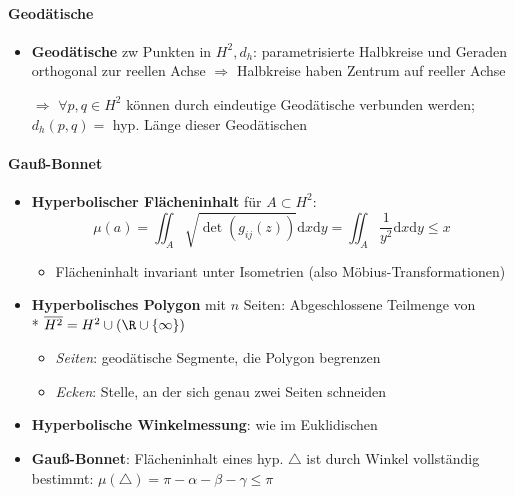 \paragraph{Geodätische}
\begin{itemize}
  \item \textbf{Geodätische} zw Punkten in \( H^2, d_h \): parametrisierte Halbkreise und Geraden orthogonal zur reellen Achse \( \Rightarrow \) Halbkreise haben Zentrum auf reeller Achse
  \item[\( \Rightarrow \)] \( \forall p,q \in H^2 \) können durch eindeutige Geodätische verbunden werden;\@ \( d_h(p,q) = \) hyp. Länge dieser Geodätischen
\end{itemize}

\paragraph{Gauß-Bonnet}
\begin{itemize}
  \item \textbf{Hyperbolischer Flächeninhalt} für \( A \subset H^2 \):
  \begin{equation*}
    \mu(a) = \iint_A \sqrt{\det(g_{ij}(z))}\text{d}x\text{d}y = \iint_A \frac{1}{y^2}\text{d}x\text{d}y \leq x
  \end{equation*}
  \begin{itemize}
    \item Flächeninhalt invariant unter Isometrien (also Möbius-Transformationen)
  \end{itemize}
  \item \textbf{Hyperbolisches Polygon} mit \( n \) Seiten: Abgeschlossene Teilmenge von \\* \( \overline{H^2} = H^2 \cup (\R \cup \left \{ \infty \right \}) \)
  \begin{itemize}
    \item \emph{Seiten}: geodätische Segmente, die Polygon begrenzen
    \item \emph{Ecken}: Stelle, an der sich genau zwei Seiten schneiden
  \end{itemize}
  \item \textbf{Hyperbolische Winkelmessung}: wie im Euklidischen
  \item \textbf{Gauß-Bonnet}: Flächeninhalt eines hyp. \( \triangle \) ist durch Winkel vollständig bestimmt: \( \mu(\triangle) = \pi - \alpha - \beta - \gamma \leq \pi \)
\end{itemize}

